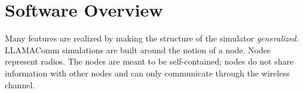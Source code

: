 

\section{Software Overview}

Many features are realized by making the structure of the
simulator \emph{generalized}.  LLAMAComm simulations are built
around the notion of a node.  Nodes represent radios.  The nodes are
meant to be self-contained; nodes do not share information with
other nodes and can only communicate through the wireless channel.

